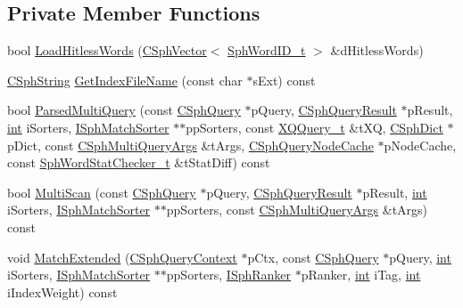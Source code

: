 \subsection*{Private Member Functions}
\begin{DoxyCompactItemize}
\item 
bool \hyperlink{classCSphIndex__VLN_a03a02f41d76a364fbb1404fd8c692e31}{Load\-Hitless\-Words} (\hyperlink{classCSphVector}{C\-Sph\-Vector}$<$ \hyperlink{sphinx_8h_a80a94d5984fdf9214a98f3e5e65df963}{Sph\-Word\-I\-D\-\_\-t} $>$ \&d\-Hitless\-Words)
\item 
\hyperlink{structCSphString}{C\-Sph\-String} \hyperlink{classCSphIndex__VLN_a05e719393720661db5f450c7abb54ab4}{Get\-Index\-File\-Name} (const char $\ast$s\-Ext) const 
\item 
bool \hyperlink{classCSphIndex__VLN_af4e39d88e985886c09c5d466258cab4e}{Parsed\-Multi\-Query} (const \hyperlink{classCSphQuery}{C\-Sph\-Query} $\ast$p\-Query, \hyperlink{classCSphQueryResult}{C\-Sph\-Query\-Result} $\ast$p\-Result, \hyperlink{sphinxexpr_8cpp_a4a26e8f9cb8b736e0c4cbf4d16de985e}{int} i\-Sorters, \hyperlink{classISphMatchSorter}{I\-Sph\-Match\-Sorter} $\ast$$\ast$pp\-Sorters, const \hyperlink{structXQQuery__t}{X\-Q\-Query\-\_\-t} \&t\-X\-Q, \hyperlink{classCSphDict}{C\-Sph\-Dict} $\ast$p\-Dict, const \hyperlink{structCSphMultiQueryArgs}{C\-Sph\-Multi\-Query\-Args} \&t\-Args, \hyperlink{classCSphQueryNodeCache}{C\-Sph\-Query\-Node\-Cache} $\ast$p\-Node\-Cache, const \hyperlink{structSphWordStatChecker__t}{Sph\-Word\-Stat\-Checker\-\_\-t} \&t\-Stat\-Diff) const 
\item 
bool \hyperlink{classCSphIndex__VLN_a95cc31d20cf4f59de5b2410a76980474}{Multi\-Scan} (const \hyperlink{classCSphQuery}{C\-Sph\-Query} $\ast$p\-Query, \hyperlink{classCSphQueryResult}{C\-Sph\-Query\-Result} $\ast$p\-Result, \hyperlink{sphinxexpr_8cpp_a4a26e8f9cb8b736e0c4cbf4d16de985e}{int} i\-Sorters, \hyperlink{classISphMatchSorter}{I\-Sph\-Match\-Sorter} $\ast$$\ast$pp\-Sorters, const \hyperlink{structCSphMultiQueryArgs}{C\-Sph\-Multi\-Query\-Args} \&t\-Args) const 
\item 
void \hyperlink{classCSphIndex__VLN_af64c320922dc7d5d8932abd32b173c55}{Match\-Extended} (\hyperlink{classCSphQueryContext}{C\-Sph\-Query\-Context} $\ast$p\-Ctx, const \hyperlink{classCSphQuery}{C\-Sph\-Query} $\ast$p\-Query, \hyperlink{sphinxexpr_8cpp_a4a26e8f9cb8b736e0c4cbf4d16de985e}{int} i\-Sorters, \hyperlink{classISphMatchSorter}{I\-Sph\-Match\-Sorter} $\ast$$\ast$pp\-Sorters, \hyperlink{classISphRanker}{I\-Sph\-Ranker} $\ast$p\-Ranker, \hyperlink{sphinxexpr_8cpp_a4a26e8f9cb8b736e0c4cbf4d16de985e}{int} i\-Tag, \hyperlink{sphinxexpr_8cpp_a4a26e8f9cb8b736e0c4cbf4d16de985e}{int} i\-Index\-Weight) const 
$$
\end{DoxyCompactItemize}
